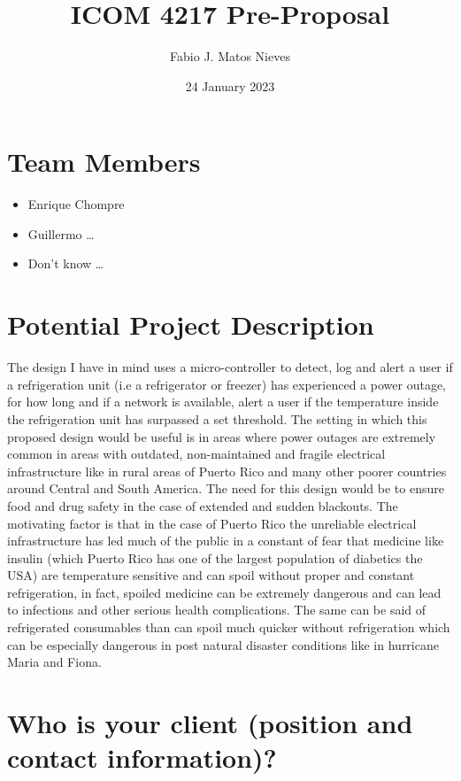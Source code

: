 \documentclass[12pt]{article}
\title{ICOM 4217 Pre-Proposal}
\author{Fabio J. Matos Nieves}
\date{24 January 2023}
\begin{document}
\maketitle
\newpage
\thispagestyle{empty}
\pagestyle{plain}
\section{Team Members}
\begin{itemize}
  \item Enrique Chompre
  \item Guillermo \dots
  \item Don't know \dots
\end{itemize} 
\newpage
\section{Potential Project Description}
The design I have in mind uses a micro-controller to detect, log and alert a user if a refrigeration unit (i.e a refrigerator or freezer) has experienced a power outage, for how long and if a network is available, alert a user if the temperature inside the refrigeration unit has surpassed a set threshold. The setting in which this proposed design would be useful is in areas where power outages are extremely common in areas with outdated, non-maintained and fragile electrical infrastructure like in rural areas of Puerto Rico and many other poorer countries around Central and South America. The need for this design would be to ensure food and drug safety in the case of extended and sudden blackouts. The motivating factor is that in the case of Puerto Rico the unreliable electrical infrastructure has led much of the public in a constant of fear that medicine like insulin (which Puerto Rico has one of the largest population of diabetics the USA) are temperature sensitive and can spoil without proper and constant refrigeration, in fact, spoiled medicine can be extremely dangerous and can lead to infections and other serious health complications. The same can be said of refrigerated consumables than can spoil much quicker without refrigeration which can be especially dangerous in post natural disaster conditions like in hurricane Maria and Fiona.
\newpage
\section{Who is your client (position and contact information)?}
\end{document}
